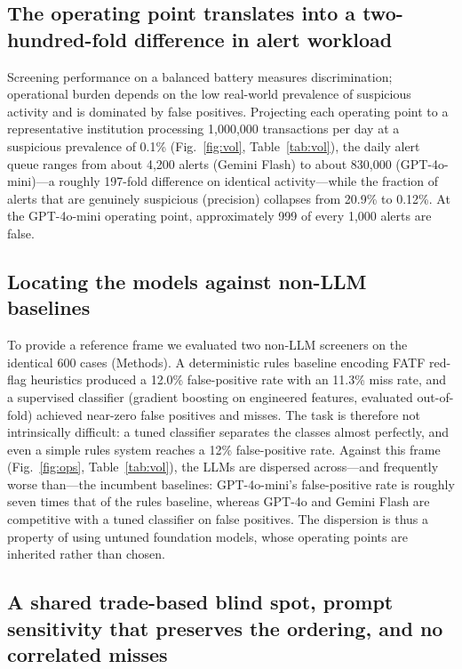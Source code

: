\documentclass[lineno,pdflatex,sn-basic,Numbered]{sn-jnl}
\begin{document}
\subsection{The operating point translates into a two-hundred-fold difference in alert workload}\label{sec:volume}

Screening performance on a balanced battery measures discrimination; operational burden depends on the low real-world prevalence of suspicious activity and is dominated by false positives. Projecting each operating point to a representative institution processing 1,000,000 transactions per day at a suspicious prevalence of 0.1\% (Fig.~\ref{fig:vol}, Table~\ref{tab:vol}), the daily alert queue ranges from about 4,200 alerts (Gemini Flash) to about 830,000 (GPT-4o-mini)---a roughly 197-fold difference on identical activity---while the fraction of alerts that are genuinely suspicious (precision) collapses from 20.9\% to 0.12\%. At the GPT-4o-mini operating point, approximately 999 of every 1,000 alerts are false.

\subsection{Locating the models against non-LLM baselines}\label{sec:baselines}

To provide a reference frame we evaluated two non-LLM screeners on the identical 600 cases (Methods). A deterministic rules baseline encoding FATF red-flag heuristics produced a 12.0\% false-positive rate with an 11.3\% miss rate, and a supervised classifier (gradient boosting on engineered features, evaluated out-of-fold) achieved near-zero false positives and misses. The task is therefore not intrinsically difficult: a tuned classifier separates the classes almost perfectly, and even a simple rules system reaches a 12\% false-positive rate. Against this frame (Fig.~\ref{fig:ops}, Table~\ref{tab:vol}), the LLMs are dispersed across---and frequently worse than---the incumbent baselines: GPT-4o-mini's false-positive rate is roughly seven times that of the rules baseline, whereas GPT-4o and Gemini Flash are competitive with a tuned classifier on false positives. The dispersion is thus a property of using untuned foundation models, whose operating points are inherited rather than chosen.

\subsection{A shared trade-based blind spot, prompt sensitivity that preserves the ordering, and no correlated misses}\label{sec:typology}
\end{document}
